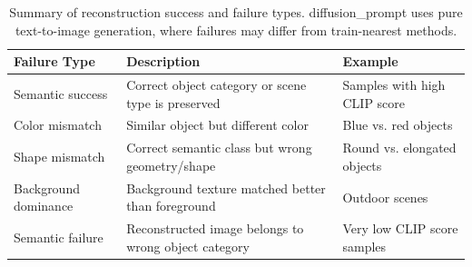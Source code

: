 \begin{table}[htbp]
\centering
\caption{Summary of reconstruction success and failure types. diffusion\_prompt uses pure text-to-image generation, where failures may differ from train-nearest methods.}
\label{tab:recon_failure_types}
\begin{tabular}{lp{6cm}l}
\toprule
\textbf{Failure Type} & \textbf{Description} & \textbf{Example} \\
\midrule
Semantic success & Correct object category or scene type is preserved & Samples with high CLIP score \\
Color mismatch & Similar object but different color & Blue vs. red objects \\
Shape mismatch & Correct semantic class but wrong geometry/shape & Round vs. elongated objects \\
Background dominance & Background texture matched better than foreground & Outdoor scenes \\
Semantic failure & Reconstructed image belongs to wrong object category & Very low CLIP score samples \\
\bottomrule
\end{tabular}
\end{table}
